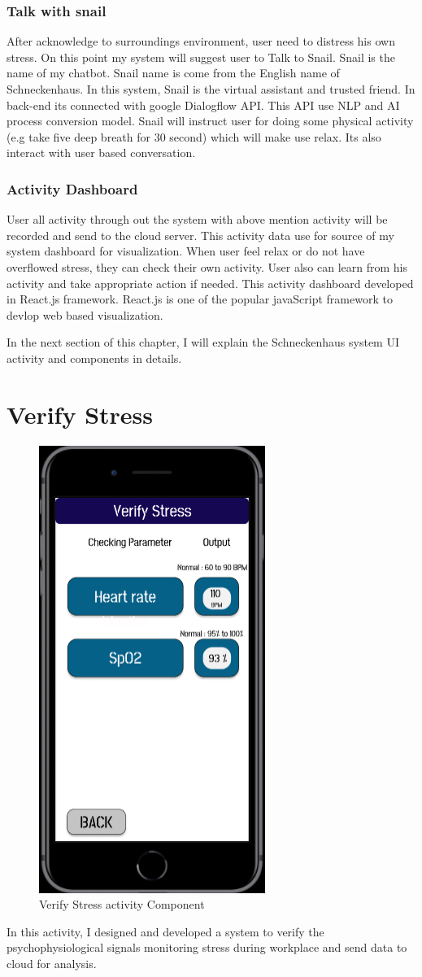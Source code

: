\subsubsection*{Talk with snail}
After acknowledge to surroundings environment, user need to distress his own stress. On this point my system will suggest user to Talk to Snail. Snail is the name of my chatbot. Snail name is come from the English name of  Schneckenhaus. In this system, Snail is the virtual assistant and trusted friend. In back-end its connected with google Dialogflow API. This API use \acs{NLP} and \acs{AI} process conversion model. Snail will instruct user for doing some physical activity (e.g take five deep breath for 30 second) which will make use relax. Its also interact with user based conversation.
\subsubsection*{Activity Dashboard}
User all activity through out the system with above mention activity will be recorded and send to the cloud server. This activity data use for source of my system dashboard for visualization. When user feel relax or do not have overflowed stress, they can check their own activity. User also can learn from his activity and take appropriate action if needed. This activity dashboard developed in React.js framework. React.js is one of the popular javaScript framework to devlop web based visualization.

In the next section of this chapter, I will explain the Schneckenhaus system UI activity and components in details.

\section{Verify Stress}
\begin{figure}[hbt!] 
  \centering
  \includegraphics[width=0.4\linewidth]{chap4/image4/sensor.png}
  \caption[Verify Stress activity Component ]{Verify Stress activity Component }
  \label{fig:Verify_Stress}
\end{figure}
In this activity, I designed and developed a system  to verify the psychophysiological signals monitoring stress during workplace and send data to cloud for analysis. 

